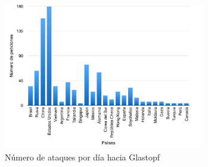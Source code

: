 \documentclass[journal]{IEEEtran}
\begin{document}
\begin{figure}[H]
\centerline{
\includegraphics[width=8.8cm]{img/glastopf}
}
\caption{Número de ataques por día hacia Glastopf}
\label{fig:glastopf}
\end{figure}
\end{document}
